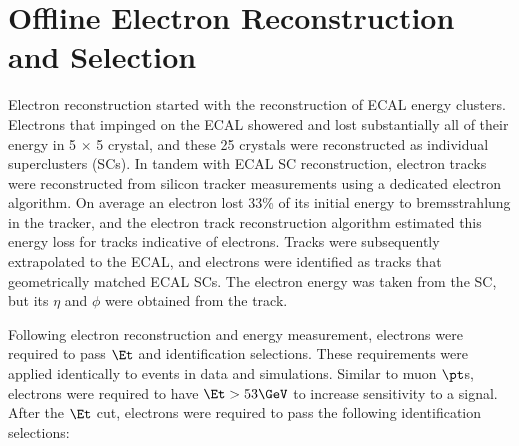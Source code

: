 \section{Offline Electron Reconstruction and Selection}
\label{sec:electronRecoAndSelection}
Electron reconstruction started with the reconstruction of ECAL energy clusters.  Electrons that impinged 
on the ECAL showered and lost substantially all of their energy in 5 $\times$ 5 crystal, and these 25 crystals 
were reconstructed as individual superclusters (SCs).  In tandem with ECAL SC reconstruction, electron tracks 
were reconstructed from silicon tracker measurements using a dedicated electron algorithm.  On average an electron 
lost 33\% of its initial energy to bremsstrahlung in the tracker, and the electron track reconstruction algorithm 
estimated this energy loss for tracks indicative of electrons.  Tracks were subsequently extrapolated to the 
ECAL, and electrons were identified as tracks that geometrically matched ECAL SCs.  The electron energy was 
taken from the SC, but its $\eta$ and $\phi$ were obtained from the track.

Following electron reconstruction and energy measurement, electrons were required to pass $\Et$ and identification 
selections.  These requirements were applied identically to events in data and simulations.  
Similar to muon $\pt$s, electrons were required to have $\Et > 53 \GeV$ to increase sensitivity to a \WR signal.  
After the $\Et$ cut, electrons were required to pass the following identification selections:

